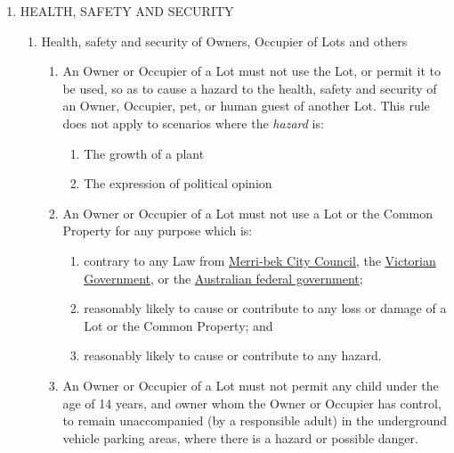 \documentclass{article}
\begin{document}
\begin{enumerate}[label=\arabic*.]

\item  HEALTH, SAFETY AND SECURITY

\begin{enumerate}[label=\arabic{enumi}.\arabic*.]

\item  Health, safety and security of Owners, Occupier of Lots and others

\begin{enumerate}[label=(\arabic*)]

\item  An Owner or Occupier of a Lot must not use the Lot, or permit it to be used, so as to cause a hazard to the health, safety and security of an Owner, Occupier, pet, or human guest of another Lot.
\newline
\newline This rule does not apply to scenarios where the \textit{hazard} is:

\begin{enumerate}[label=(\alph*)]
\item  The growth of a plant
\item  The expression of political opinion
\end{enumerate}

\item  An Owner or Occupier of a Lot must not use a Lot or the Common Property for any purpose which is:

\begin{enumerate}[label=(\alph*)]

\item  contrary to any Law from \href{https://www.merri-bek.vic.gov.au/}{Merri-bek City Council}, the \href{https://www.vic.gov.au/}{Victorian Government}, or the \href{https://my.gov.au/en/services}{Australian federal government};

\item  reasonably likely to cause or contribute to any loss or damage of a Lot or the Common Property; and

\item  reasonably likely to cause or contribute to any hazard.

\end{enumerate}

\item  An Owner or Occupier of a Lot must not permit any child under the age of 14 years, and owner whom the Owner or Occupier has control, to remain unaccompanied (by a responsible adult) in the underground vehicle parking areas, where there is a hazard or possible danger.


\end{enumerate}
\end{enumerate}
\end{enumerate}
\end{document}
